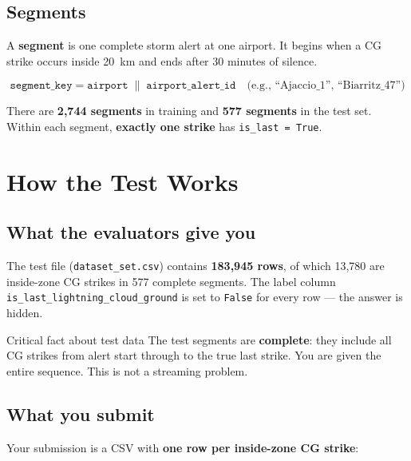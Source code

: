 \documentclass[12pt,a4paper]{article}
\begin{document}
\subsection{Segments}

A \textbf{segment} is one complete storm alert at one airport. It begins when a CG strike occurs inside 20~km and ends after 30 minutes of silence.

\begin{equation}
  \texttt{segment\_key} = \texttt{airport} \;\|\; \texttt{airport\_alert\_id}
  \quad \text{(e.g., ``Ajaccio\_1'', ``Biarritz\_47'')}
\end{equation}

There are \textbf{2,744 segments} in training and \textbf{577 segments} in the test set. Within each segment, \textbf{exactly one strike} has \texttt{is\_last = True}.

\newpage

\section{How the Test Works}

\subsection{What the evaluators give you}

The test file (\texttt{dataset\_set.csv}) contains \textbf{183,945 rows}, of which 13,780 are inside-zone CG strikes in 577 complete segments. The label column \texttt{is\_last\_lightning\_cloud\_ground} is set to \texttt{False} for every row --- the answer is hidden.

\begin{infobox}{Critical fact about test data}
The test segments are \textbf{complete}: they include all CG strikes from alert start through to the true last strike. You are given the entire sequence. This is not a streaming problem.
\end{infobox}

\subsection{What you submit}

Your submission is a CSV with \textbf{one row per inside-zone CG strike}:
\end{document}
